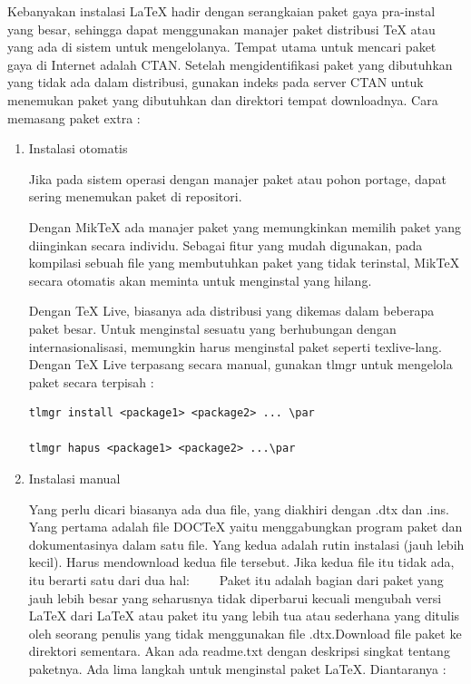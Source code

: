 \hspace{0.50in} Kebanyakan instalasi LaTeX hadir dengan serangkaian paket gaya pra-instal yang besar, sehingga dapat menggunakan manajer paket distribusi TeX atau yang ada di sistem untuk mengelolanya. Tempat utama untuk mencari paket gaya di Internet adalah CTAN. Setelah mengidentifikasi paket yang dibutuhkan yang tidak ada dalam distribusi, gunakan indeks pada server CTAN untuk menemukan paket yang dibutuhkan dan direktori tempat downloadnya. Cara memasang paket extra :\par
\begin{enumerate}
\item Instalasi otomatis\par

\hspace{0.50in} Jika pada sistem operasi dengan manajer paket atau pohon portage, dapat sering menemukan paket di repositori. \par

\hspace{0.50in} Dengan MikTeX ada manajer paket yang memungkinkan memilih paket yang diinginkan secara individu. Sebagai fitur yang mudah digunakan, pada kompilasi sebuah file yang membutuhkan paket yang tidak terinstal, MikTeX secara otomatis akan meminta untuk menginstal yang hilang.

\hspace{0.50in} Dengan TeX Live, biasanya ada distribusi yang dikemas dalam beberapa paket besar. Untuk menginstal sesuatu yang berhubungan dengan internasionalisasi, memungkin harus menginstal paket seperti texlive-lang. Dengan TeX Live terpasang secara manual, gunakan tlmgr untuk mengelola paket secara terpisah :
\begin{verbatim}
tlmgr install <package1> <package2> ... \par

tlmgr hapus <package1> <package2> ...\par
\end{verbatim}

\item Instalasi manual\par
\hspace{0.50in} Yang perlu dicari biasanya ada dua file, yang diakhiri dengan .dtx dan .ins. Yang pertama adalah file DOCTeX yaitu menggabungkan program paket dan dokumentasinya dalam satu file. Yang kedua adalah rutin instalasi (jauh lebih kecil). Harus mendownload kedua file tersebut. Jika kedua file itu tidak ada, itu berarti satu dari dua hal:     Paket itu adalah bagian dari paket yang jauh lebih besar yang seharusnya tidak diperbarui kecuali mengubah versi LaTeX dari LaTeX atau paket itu yang lebih tua atau sederhana yang ditulis oleh seorang penulis yang tidak menggunakan file .dtx.Download file paket ke direktori sementara. Akan ada readme.txt dengan deskripsi singkat tentang paketnya.  Ada lima langkah untuk menginstal paket LaTeX. Diantaranya :


\end{enumerate}
